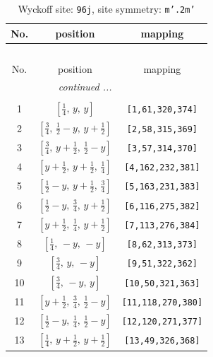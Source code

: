 \documentclass[fleqn,8pt]{jsarticle}
\begin{document}
\begin{longtable}{ccc}
\caption{Wyckoff site: {\tt 96j}, site symmetry: {\tt m'.2m'}}
 \\
 \hline \hline
No. & position & mapping \\ \hline \endfirsthead

\multicolumn{2}{l}{\tablename\ \thetable{}} \\
 \hline \hline
No. & position & mapping \\ \hline \endhead

 \hline \hline
\multicolumn{2}{r}{\footnotesize\it continued ...} \\ \endfoot

 \hline \hline
\multicolumn{2}{r}{} \\ \endlastfoot

1 & $\left[ \frac{1}{4},\, y,\, y \right]$ & {\tt [1,61,320,374]} \\ \hline
2 & $\left[ \frac{3}{4},\, \frac{1}{2} - y,\, y + \frac{1}{2} \right]$ & {\tt [2,58,315,369]} \\ \hline
3 & $\left[ \frac{3}{4},\, y + \frac{1}{2},\, \frac{1}{2} - y \right]$ & {\tt [3,57,314,370]} \\ \hline
4 & $\left[ y + \frac{1}{2},\, y + \frac{1}{2},\, \frac{1}{4} \right]$ & {\tt [4,162,232,381]} \\ \hline
5 & $\left[ \frac{1}{2} - y,\, y + \frac{1}{2},\, \frac{3}{4} \right]$ & {\tt [5,163,231,383]} \\ \hline
6 & $\left[ \frac{1}{2} - y,\, \frac{3}{4},\, y + \frac{1}{2} \right]$ & {\tt [6,116,275,382]} \\ \hline
7 & $\left[ y + \frac{1}{2},\, \frac{1}{4},\, y + \frac{1}{2} \right]$ & {\tt [7,113,276,384]} \\ \hline
8 & $\left[ \frac{1}{4},\, - y,\, - y \right]$ & {\tt [8,62,313,373]} \\ \hline
9 & $\left[ \frac{3}{4},\, y,\, - y \right]$ & {\tt [9,51,322,362]} \\ \hline
10 & $\left[ \frac{3}{4},\, - y,\, y \right]$ & {\tt [10,50,321,363]} \\ \hline
11 & $\left[ y + \frac{1}{2},\, \frac{3}{4},\, \frac{1}{2} - y \right]$ & {\tt [11,118,270,380]} \\ \hline
12 & $\left[ \frac{1}{2} - y,\, \frac{1}{4},\, \frac{1}{2} - y \right]$ & {\tt [12,120,271,377]} \\ \hline
13 & $\left[ \frac{1}{4},\, y + \frac{1}{2},\, y + \frac{1}{2} \right]$ & {\tt [13,49,326,368]} \\ \hline

\end{longtable}
\end{document}
